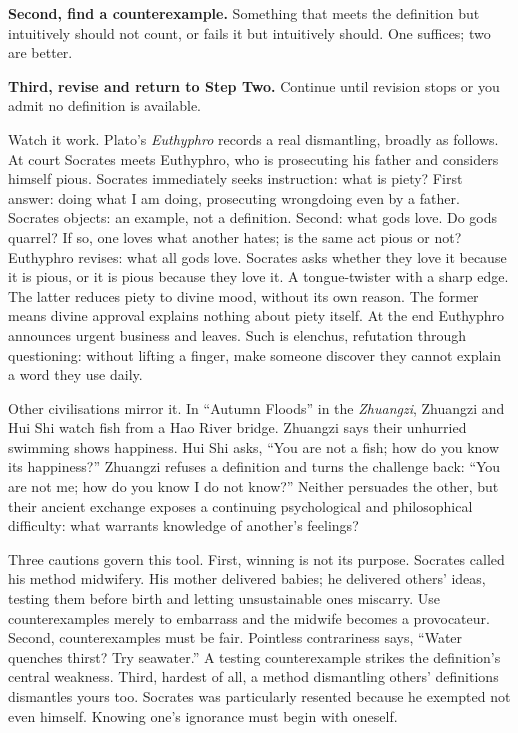 \textbf{Second, find a counterexample.} Something that meets the definition but intuitively should not count, or fails it but intuitively should. One suffices; two are better.

\textbf{Third, revise and return to Step Two.} Continue until revision stops or you admit no definition is available.

Watch it work. Plato's \textit{Euthyphro} records a real dismantling, broadly as follows. At court Socrates meets Euthyphro, who is prosecuting his father and considers himself pious. Socrates immediately seeks instruction: what is piety? First answer: doing what I am doing, prosecuting wrongdoing even by a father. Socrates objects: an example, not a definition. Second: what gods love. Do gods quarrel? If so, one loves what another hates; is the same act pious or not? Euthyphro revises: what all gods love. Socrates asks whether they love it because it is pious, or it is pious because they love it. A tongue-twister with a sharp edge. The latter reduces piety to divine mood, without its own reason. The former means divine approval explains nothing about piety itself. At the end Euthyphro announces urgent business and leaves. Such is elenchus, refutation through questioning: without lifting a finger, make someone discover they cannot explain a word they use daily.

Other civilisations mirror it. In ``Autumn Floods'' in the \textit{Zhuangzi}, Zhuangzi and Hui Shi watch fish from a Hao River bridge. Zhuangzi says their unhurried swimming shows happiness. Hui Shi asks, ``You are not a fish; how do you know its happiness?'' Zhuangzi refuses a definition and turns the challenge back: ``You are not me; how do you know I do not know?'' Neither persuades the other, but their ancient exchange exposes a continuing psychological and philosophical difficulty: what warrants knowledge of another's feelings?

Three cautions govern this tool. First, winning is not its purpose. Socrates called his method midwifery. His mother delivered babies; he delivered others' ideas, testing them before birth and letting unsustainable ones miscarry. Use counterexamples merely to embarrass and the midwife becomes a provocateur. Second, counterexamples must be fair. Pointless contrariness says, ``Water quenches thirst? Try seawater.'' A testing counterexample strikes the definition's central weakness. Third, hardest of all, a method dismantling others' definitions dismantles yours too. Socrates was particularly resented because he exempted not even himself. Knowing one's ignorance must begin with oneself.

